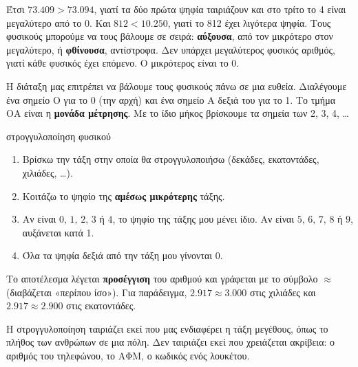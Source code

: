 Έτσι $73.409>73.094$, γιατί τα δύο πρώτα ψηφία ταιριάζουν και στο τρίτο το 4 είναι μεγαλύτερο από το 0. Και $812<10.250$, γιατί το 812 έχει λιγότερα ψηφία. Τους φυσικούς μπορούμε να τους βάλουμε σε σειρά: \textbf{αύξουσα}, από τον μικρότερο στον μεγαλύτερο, ή \textbf{φθίνουσα}, αντίστροφα. Δεν υπάρχει μεγαλύτερος φυσικός αριθμός, γιατί κάθε φυσικός έχει επόμενο. Ο μικρότερος είναι το 0.


Η διάταξη μας επιτρέπει να βάλουμε τους φυσικούς πάνω σε μια ευθεία. Διαλέγουμε ένα σημείο Ο για το 0 (την αρχή) και ένα σημείο Α δεξιά του για το 1. Το τμήμα ΟΑ είναι η \textbf{μονάδα μέτρησης}. Με το ίδιο μήκος βρίσκουμε τα σημεία των 2, 3, 4, \dots

\begin{center}
\end{center}


\begin{kanonas}{στρογγυλοποίηση φυσικού}
\begin{enumerate}[leftmargin=1.6em,itemsep=0.2ex,topsep=2pt]
\item Βρίσκω την τάξη στην οποία θα στρογγυλοποιήσω (δεκάδες, εκατοντάδες, χιλιάδες, \dots).
\item Κοιτάζω το ψηφίο της \textbf{αμέσως μικρότερης} τάξης.
\item Αν είναι $0,\,1,\,2,\,3$ ή $4$, το ψηφίο της τάξης μου μένει ίδιο. Αν είναι $5,\,6,\,7,\,8$ ή $9$, αυξάνεται κατά 1.
\item Όλα τα ψηφία δεξιά από την τάξη μου γίνονται 0.
\end{enumerate}
\end{kanonas}

Το αποτέλεσμα λέγεται \textbf{προσέγγιση} του αριθμού και γράφεται με το σύμβολο $\approx$ (διαβάζεται «περίπου ίσο»). Για παράδειγμα, $2.917\approx 3.000$ στις χιλιάδες και $2.917\approx 2.900$ στις εκατοντάδες.

Η στρογγυλοποίηση ταιριάζει εκεί που μας ενδιαφέρει η τάξη μεγέθους, όπως το πλήθος των ανθρώπων σε μια πόλη. Δεν ταιριάζει εκεί που χρειάζεται ακρίβεια: ο αριθμός του τηλεφώνου, το ΑΦΜ, ο κωδικός ενός λουκέτου.

